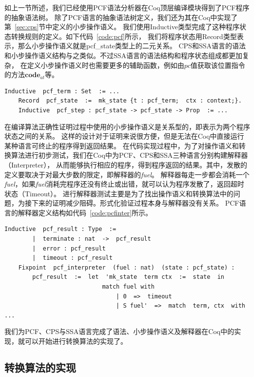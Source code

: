 如上一节所述，我们已经使用PCF语法分析器在Coq顶层编译模块得到了PCF程序的抽象语法树。
除了PCF语言的抽象语法树定义，我们还为其在Coq中实现了第~\ref{sec:cps}节中定义的小步操作语义。
我们使用Inductive类型完成了这种程序状态转换规则的定义。如下代码~\ref{code:pcf}所示，
我们将程序状态用Record类型表示，那么小步操作语义就是pcf\_state类型上的二元关系。
CPS和SSA语言的语法和小步操作语义结构与之类似。不过SSA语言的语法结构和程序状态组成都更加复杂，
在定义小步操作语义时也需要更多的辅助函数，例如由$pc$值获取该位置指令的方法$\mathbf{code}_{at}$等。

\begin{lstlisting}[language=Coq, caption=Coq中的PCF语法与语义定义结构, label=code:pcf]
    Inductive  pcf_term : Set  := ...
    Record  pcf_state  :=  mk_state {t : pcf_term;  ctx : context;}.
    Inductive  pcf_step : pcf_state -> pcf_state -> Prop  := ...
\end{lstlisting}

在编译算法正确性证明过程中使用的小步操作语义是关系型的，即表示为两个程序状态之间的关系。
这样的设计对于证明来说很方便，但是无法在Coq中直接运行某种语言可终止的程序得到返回结果。
在代码实现过程中，为了对操作语义和转换算法进行初步测试，我们在Coq中为PCF、CPS和SSA三种语言分别构建解释器（Interpreter），
从而能够执行相应的程序，得到程序返回的结果。其中，发散的定义要取决于对最大步数的限定，即解释器的\textit{fuel}。
解释器每走一步都会消耗一个\textit{fuel}，如果\textit{fuel}消耗完程序还没有终止或出错，就可以认为程序发散了，返回超时状态（Timeout）。
进行解释器测试主要是为了找出操作语义和转换算法中的问题，为接下来的证明减少阻碍。形式化验证过程本身与解释器没有关系。
PCF语言的解释器定义结构如代码~\ref{code:pcfinter}所示。

\begin{lstlisting}[language=Coq, caption=Coq中的PCF语言的解释器, label=code:pcfinter]
    Inductive  pcf_result : Type  := 
        |  terminate : nat  ->  pcf_result 
        |  error : pcf_result
        |  timeout : pcf_result
    Fixpoint  pcf_interpreter  (fuel : nat)  (state : pcf_state) : 
        pcf_result  :=  let  'mk_state  term ctx  :=  state  in
                            match fuel with 
                                | 0  =>  timeout 
                                | S fuel'  =>  match  term, ctx  with ...
\end{lstlisting}

我们为PCF、CPS与SSA语言完成了语法、小步操作语义及解释器在Coq中的实现，就可以开始进行转换算法的实现了。

\subsection{转换算法的实现}

